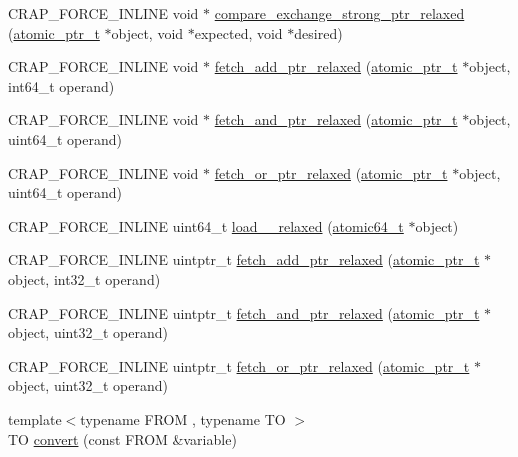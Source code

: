\begin{DoxyCompactItemize}
\item 
C\+R\+A\+P\+\_\+\+F\+O\+R\+C\+E\+\_\+\+I\+N\+L\+I\+N\+E void $\ast$ \hyperlink{namespacecrap_a0d7a51fdb5f2784c18fd063a0c6f9791}{compare\+\_\+exchange\+\_\+strong\+\_\+ptr\+\_\+relaxed} (\hyperlink{structcrap_1_1atomic__ptr__t}{atomic\+\_\+ptr\+\_\+t} $\ast$object, void $\ast$expected, void $\ast$desired)
\item 
C\+R\+A\+P\+\_\+\+F\+O\+R\+C\+E\+\_\+\+I\+N\+L\+I\+N\+E void $\ast$ \hyperlink{namespacecrap_a354f3fb9a13ba30612116ac432c895a1}{fetch\+\_\+add\+\_\+ptr\+\_\+relaxed} (\hyperlink{structcrap_1_1atomic__ptr__t}{atomic\+\_\+ptr\+\_\+t} $\ast$object, int64\+\_\+t operand)
\item 
C\+R\+A\+P\+\_\+\+F\+O\+R\+C\+E\+\_\+\+I\+N\+L\+I\+N\+E void $\ast$ \hyperlink{namespacecrap_ad2d918250c73ce4536f7bbf3528e92fa}{fetch\+\_\+and\+\_\+ptr\+\_\+relaxed} (\hyperlink{structcrap_1_1atomic__ptr__t}{atomic\+\_\+ptr\+\_\+t} $\ast$object, uint64\+\_\+t operand)
\item 
C\+R\+A\+P\+\_\+\+F\+O\+R\+C\+E\+\_\+\+I\+N\+L\+I\+N\+E void $\ast$ \hyperlink{namespacecrap_a3ce08fa76a5dc6fd7baaa059bf1abef5}{fetch\+\_\+or\+\_\+ptr\+\_\+relaxed} (\hyperlink{structcrap_1_1atomic__ptr__t}{atomic\+\_\+ptr\+\_\+t} $\ast$object, uint64\+\_\+t operand)
\item 
C\+R\+A\+P\+\_\+\+F\+O\+R\+C\+E\+\_\+\+I\+N\+L\+I\+N\+E uint64\+\_\+t \hyperlink{namespacecrap_a42e060337e4db7ca2a11b837ee41d7f1}{load\+\_\+\_\+relaxed} (\hyperlink{structcrap_1_1atomic64__t}{atomic64\+\_\+t} $\ast$object)
\item 
C\+R\+A\+P\+\_\+\+F\+O\+R\+C\+E\+\_\+\+I\+N\+L\+I\+N\+E uintptr\+\_\+t \hyperlink{namespacecrap_a34d204743b05b81dde81837f7c505df8}{fetch\+\_\+add\+\_\+ptr\+\_\+relaxed} (\hyperlink{structcrap_1_1atomic__ptr__t}{atomic\+\_\+ptr\+\_\+t} $\ast$object, int32\+\_\+t operand)
\item 
C\+R\+A\+P\+\_\+\+F\+O\+R\+C\+E\+\_\+\+I\+N\+L\+I\+N\+E uintptr\+\_\+t \hyperlink{namespacecrap_a0bb01b9c4981c61546b930bc6ff36d44}{fetch\+\_\+and\+\_\+ptr\+\_\+relaxed} (\hyperlink{structcrap_1_1atomic__ptr__t}{atomic\+\_\+ptr\+\_\+t} $\ast$object, uint32\+\_\+t operand)
\item 
C\+R\+A\+P\+\_\+\+F\+O\+R\+C\+E\+\_\+\+I\+N\+L\+I\+N\+E uintptr\+\_\+t \hyperlink{namespacecrap_a31b8b6da5f84a64fa1e35186e7929682}{fetch\+\_\+or\+\_\+ptr\+\_\+relaxed} (\hyperlink{structcrap_1_1atomic__ptr__t}{atomic\+\_\+ptr\+\_\+t} $\ast$object, uint32\+\_\+t operand)
\item 
{\footnotesize template$<$typename F\+R\+O\+M , typename T\+O $>$ }\\T\+O \hyperlink{namespacecrap_afe6bc6d7a278bda669ff709f655b8789}{convert} (const F\+R\+O\+M \&variable)

\end{DoxyCompactItemize}

